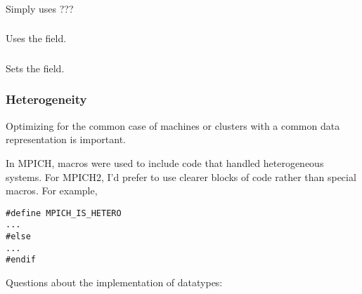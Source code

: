 \documentclass{article}
\begin{document}
\subsubsection{}
Simply uses ???

\subsubsection{}
Uses the  field.

\subsubsection{}
Sets the  field.

\subsubsection{}
\subsubsection{}

\subsubsection{}

\subsubsection{Heterogeneity}
\label{sec:hetero}
Optimizing for the common case of machines or clusters with a common
data representation is important.  

In MPICH, macros were used to include code that handled heterogeneous
systems.  For MPICH2, I'd prefer to use clearer blocks of code rather
than special macros.  For example,
\begin{verbatim}
#define MPICH_IS_HETERO
...
#else
...
#endif
\end{verbatim}

Questions about the implementation of datatypes:
\end{document}
